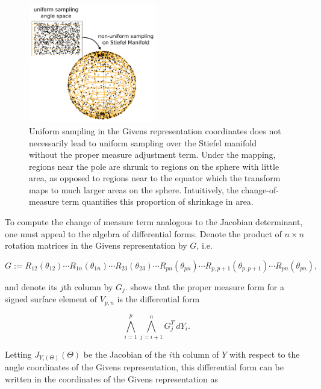 \documentclass[ba]{imsart}
\numberwithin{equation}{section}
\theoremstyle{plain}
\begin{document}
\begin{figure}[h]
\centering
\vspace{.1in}
\includegraphics[width=0.5\textwidth]{figures/AreaForm_atz.pdf}
\vspace{.05in}
\caption{Uniform sampling in the Givens representation coordinates does not necessarily lead to uniform sampling over the Stiefel manifold without the proper measure adjustment term. Under the mapping, regions near the pole are shrunk to regions on the sphere with little area, as opposed to regions near to the equator which the transform maps to much larger areas on the sphere. Intuitively, the change-of-measure term quantifies this proportion of shrinkage in area.}
\label{fig:AreaForm}
\end{figure}


\noindent To compute the change of measure term analogous to the Jacobian determinant, one must appeal to the algebra of differential forms. Denote the product of $n \times n$ rotation matrices in the Givens representation by $G$, i.e. 


\begin{equation}
G := R_{12}(\theta_{12}) \cdots R_{1n}(\theta_{1n})  \cdots R_{23}(\theta_{23}) \cdots R_{pn}(\theta_{pn}) \cdots R_{p,p+1}(\theta_{p,p+1}) \cdots R_{pn}(\theta_{pn}),
\end{equation}

\noindent and denote its $j$th column by $G_j$. \cite{muirhead2009aspects} shows that the proper measure form for a signed surface element of $V_{p,n}$ is the differential form

\begin{equation}
\label{eq:WedgeForm}
\bigwedge_{i=1}^p \bigwedge_{j=i+1}^n G_j^T\, dY_i.
\end{equation}

\noindent Letting $J_{Y_i(\Theta)}(\Theta)$ be the Jacobian of the $i$th column of $Y$ with respect to the angle coordinates of the Givens representation, this differential form can be written in the coordinates of the Givens representation as
\end{document}
